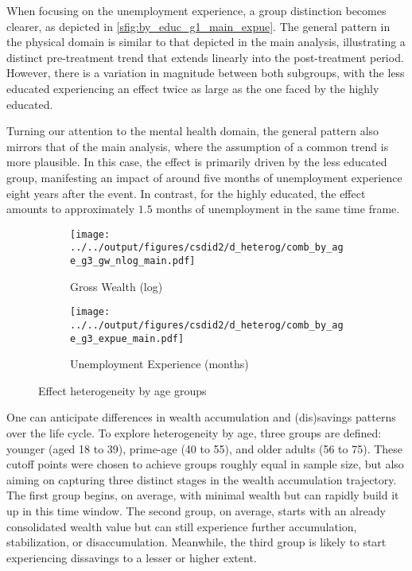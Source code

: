 When focusing on the unemployment experience, a group distinction becomes clearer, as depicted in
\cref{sfig:by_educ_g1_main_expue}. The general pattern in the physical domain is similar to that depicted in
the main analysis, illustrating a distinct pre-treatment trend that extends linearly into the post-treatment
period. However, there is a variation in magnitude between both subgroups, with the less educated experiencing
an effect twice as large as the one faced by the highly educated.

Turning our attention to the mental health domain, the general pattern also mirrors that of the main analysis,
where the assumption of a common trend is more plausible. In this case, the effect is primarily driven by the
less educated group, manifesting an impact of around five months of unemployment experience eight years after
the event. In contrast, for the highly educated, the effect amounts to approximately $1.5$ months of
unemployment in the same time frame.


%
%
\begin{figure}[tb!]
    \centering
    \begin{subfigure}{0.95\textwidth}
        \caption{Gross Wealth (log)}
        \texttt{[image: ../../output/figures/csdid2/d\_heterog/comb\_by\_age\_g3\_gw\_nlog\_main.pdf]}
        \label{sfig:comb_by_age_g3_gw_nlog_main}
    \end{subfigure}
    \begin{subfigure}{0.95\textwidth}
        \caption{Unemployment Experience (months)}
        \texttt{[image: ../../output/figures/csdid2/d\_heterog/comb\_by\_age\_g3\_expue\_main.pdf]}
        \label{sfig:comb_by_age_g3_expue_main}
    \end{subfigure}
    \caption{Effect heterogeneity by age groups}
    \label{fig:heterog_age}
\end{figure}

One can anticipate differences in wealth accumulation and (dis)savings patterns over the life cycle. To explore
heterogeneity by age, three groups are defined: younger (aged 18 to 39), prime-age (40 to 55), and older adults 
(56 to 75). These cutoff points were chosen to achieve groups roughly equal in sample size, but also aiming on
capturing three distinct stages in the wealth accumulation trajectory. The first group begins, on average, with
minimal wealth but can rapidly build it up in this time window. The second group, on average, starts with an
already consolidated wealth value but can still experience further accumulation, stabilization, or
disaccumulation. Meanwhile, the third group is likely to start experiencing dissavings to a lesser or higher
extent.


